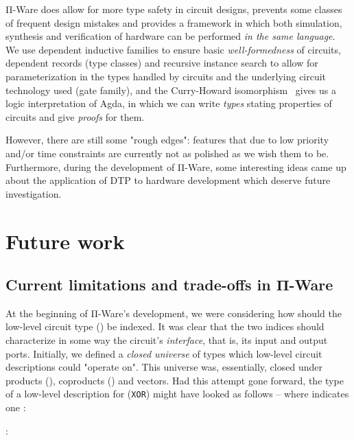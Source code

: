     Π-Ware does allow for more type safety in circuit designs,
    prevents some classes of frequent design mistakes and provides a framework
    in which both simulation, synthesis and verification of hardware can be performed \emph{in the same language}.
    We use dependent inductive families to ensure basic \emph{well-formedness} of circuits,
    dependent records (type classes) and recursive instance search to allow for parameterization
    in the types handled by circuits and the underlying circuit technology used (gate family),
    and the Curry-Howard isomorphism~\cite{propositions-as-types} gives us a logic interpretation of Agda,
    in which we can write \emph{types} stating properties of circuits and give \emph{proofs} for them.

    However, there are still some "rough edges": features that due to low priority and/or time constraints
    are currently not as polished as we wish them to be.
    Furthermore, during the development of Π-Ware, some interesting ideas came up about the application
    of \ac{DTP} to hardware development which deserve future investigation.


    \section{Future work}
    \label{sec:future-work}

        \subsection{Current limitations and trade-offs in Π-Ware}
        \label{subsec:current-limitations}

            At the beginning of Π-Ware's development, we were considering
            how should the low-level circuit type () be indexed.
            It was clear that the two indices should characterize in some way the circuit's \emph{interface},
            that is, its input and output ports.
            Initially, we defined a \emph{closed universe} of types which low-level circuit descriptions
            could "operate on". This universe was, essentially, closed under products (),
            coproducts () and vectors.
            Had this attempt gone forward, the type of a low-level description for  (\texttt{XOR})
            might have looked as follows – where  indicates one :

            \begin{center}
                 :  \AY{(}  \AY{)} 
            \end{center}

